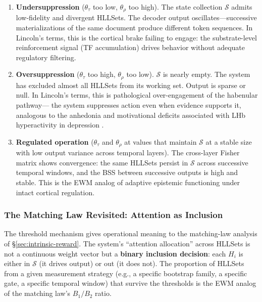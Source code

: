 \documentclass[11pt,a4paper]{article}
\theoremstyle{remark}
\begin{document}
\begin{enumerate}[leftmargin=*,nosep]
  \item \textbf{Undersuppression} ($\theta_{\tau}$ too low, $\theta_{\rho}$
    too high). The state collection $\mathcal{S}$ admits low-fidelity and
    divergent HLLSets. The decoder output oscillates---successive
    materializations of the same document produce different token sequences.
    In Lincoln's terms, this is the cortical brake failing to engage: the
    substrate-level reinforcement signal (TF accumulation) drives behavior
    without adequate regulatory filtering.
  \item \textbf{Oversuppression} ($\theta_{\tau}$ too high, $\theta_{\rho}$
    too low). $\mathcal{S}$ is nearly empty. The system has excluded almost
    all HLLSets from its working set. Output is sparse or null. In Lincoln's
    terms, this is pathological over-engagement of the habenular pathway---
    the system suppresses action even when evidence supports it, analogous to
    the anhedonia and motivational deficits associated with LHb hyperactivity
    in depression \cite{lincoln2026}.
  \item \textbf{Regulated operation} ($\theta_{\tau}$ and $\theta_{\rho}$
    at values that maintain $\mathcal{S}$ at a stable size with low output
    variance across temporal layers). The cross-layer Fisher matrix shows
    convergence: the same HLLSets persist in $\mathcal{S}$ across successive
    temporal windows, and the BSS between successive outputs is high and
    stable. This is the EWM analog of adaptive epistemic functioning under
    intact cortical regulation.
\end{enumerate}

\subsubsection{The Matching Law Revisited: Attention as Inclusion}

The threshold mechanism gives operational meaning to the matching-law analysis
of \S\ref{sec:intrinsic-reward}. The system's ``attention allocation''
across HLLSets is not a continuous weight vector but a \textbf{binary
inclusion decision}: each $H_i$ is either in $\mathcal{S}$ (it drives output)
or out (it does not). The proportion of HLLSets from a given measurement
strategy (e.g., a specific bootstrap family, a specific gate, a specific
temporal window) that survive the thresholds is the EWM analog of the matching
law's $B_1 / B_2$ ratio.
\end{document}
